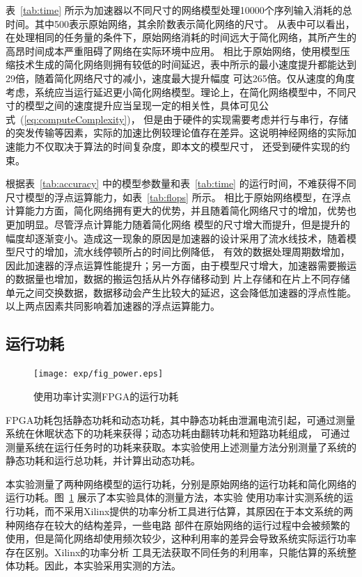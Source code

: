 表~\ref{tab:time} 所示为加速器以不同尺寸的网络模型处理10000个序列输入消耗的总时间。其中500表示原始网络，其余阶数表示简化网络的尺寸。
从表中可以看出，在处理相同的任务量的条件下，原始网络消耗的时间远大于简化网络，其所产生的高昂时间成本严重阻碍了网络在实际环境中应用。
相比于原始网络，使用模型压缩技术生成的简化网络则拥有较低的时间延迟，表中所示的最小速度提升都能达到29倍，随着简化网络尺寸的减小，速度最大提升幅度
可达265倍。仅从速度的角度考虑，系统应当运行延迟更小简化网络模型。理论上，在简化网络模型中，不同尺寸的模型之间的速度提升应当呈现一定的相关性，具体可见公式~(\ref{eq:computeComplexity})，
但是由于硬件的实现需要考虑并行与串行，存储的突发传输等因素，实际的加速比例较理论值存在差异。这说明神经网络的实际加速能力不仅取决于算法的时间复杂度，即本文的模型尺寸，
还受到硬件实现的约束。



根据表~\ref{tab:accuracy} 中的模型参数量和表~\ref{tab:time} 的运行时间，不难获得不同尺寸模型的浮点运算能力，如表~\ref{tab:flops} 所示。
相比于原始网络模型，在浮点计算能力方面，简化网络拥有更大的优势，并且随着简化网络尺寸的增加，优势也更加明显。尽管浮点计算能力随着简化网络
模型的尺寸增大而提升，但是提升的幅度却逐渐变小。造成这一现象的原因是加速器的设计采用了流水线技术，随着模型尺寸的增加，流水线停顿所占的时间比例降低，
有效的数据处理周期数增加，因此加速器的浮点运算性能提升；另一方面，由于模型尺寸增大，加速器需要搬运的数据量也增加，数据的搬运包括从片外存储移动到
片上存储和在片上不同存储单元之间交换数据，数据移动会产生比较大的延迟，这会降低加速器的浮点性能。以上两点因素共同影响着加速器的浮点运算能力。

\subsection{运行功耗}

\begin{figure}
	\centering
	\texttt{[image: exp/fig\_power.eps]}
	\caption{使用功率计实测FPGA的运行功耗}
	\label{fig:power}
\end{figure}



FPGA功耗包括静态功耗和动态功耗，其中静态功耗由泄漏电流引起，可通过测量系统在休眠状态下的功耗来获得；动态功耗由翻转功耗和短路功耗组成，
可通过测量系统在运行任务时的功耗来获取。本实验使用上述测量方法分别测量了系统的静态功耗和运行总功耗，并计算出动态功耗。

本实验测量了两种网络模型的运行功耗，分别是原始网络的运行功耗和简化网络的运行功耗。图~\ref{fig:power} 展示了本实验具体的测量方法，本实验
使用功率计实测系统的运行功耗，而不采用Xilinx提供的功率分析工具进行估算，其原因在于本文系统的两种网络存在较大的结构差异，一些电路
部件在原始网络的运行过程中会被频繁的使用，但是简化网络却使用频次较少，这种利用率的差异会导致系统实际运行功率存在区别。Xilinx的功率分析
工具无法获取不同任务的利用率，只能估算的系统整体功耗。因此，本实验采用实测的方法。

